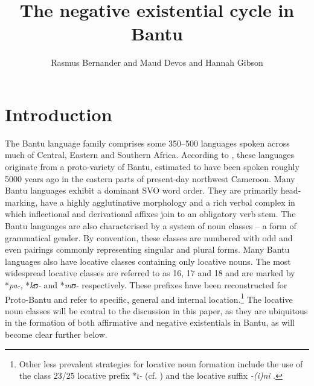 \documentclass[output=paper]{langscibook}
\title{The negative existential cycle in Bantu}
\author{%
Rasmus Bernander\affiliation{University of Helsinki} and
Maud Devos\affiliation{Ghent University} and
Hannah Gibson\affiliation{University of Essex}%
}
\begin{document}
\section{Introduction}\label{sec:1:1} The Bantu language family
comprises some 350--500 languages spoken across much of Central, Eastern
and Southern Africa. According to \citet{Grollemund2015}, these languages
originate from a proto-variety of Bantu, estimated to have been spoken
roughly 5000 years ago in the eastern parts of present-day northwest
Cameroon. Many Bantu languages exhibit a dominant SVO word order. They are
primarily head-marking, have a highly agglutinative morphology and a rich
verbal complex in which inflectional and derivational affixes join to an
obligatory verb stem. The Bantu languages are also characterised by a
system of noun classes -- a form of grammatical gender. By convention,
these classes are numbered with odd and even pairings commonly representing
singular and plural forms. Many Bantu languages also have locative classes
containing only  locative nouns. The most widespread locative classes are
referred to as 16, 17 and 18 and are marked by *{\it pa-}, *{\it kʊ-} and
*{\it mʊ-} respectively. These prefixes have been reconstructed for
Proto-Bantu and refer to
specific, general and internal location.\footnote{Other less prevalent
strategies for locative noun formation include the use of the class 23/25
locative prefix *{\it ɩ-} (cf.
\citealt{Gregoire1975,Maho1999}) and
the locative suffix {\it -(i)ni} \citep{SamsonSchadeberg1994}.} The locative noun classes will be central
to the discussion in this paper, as they are ubiquitous in the formation of
both affirmative and negative existentials in Bantu, as will become clear
further below.
\end{document}
